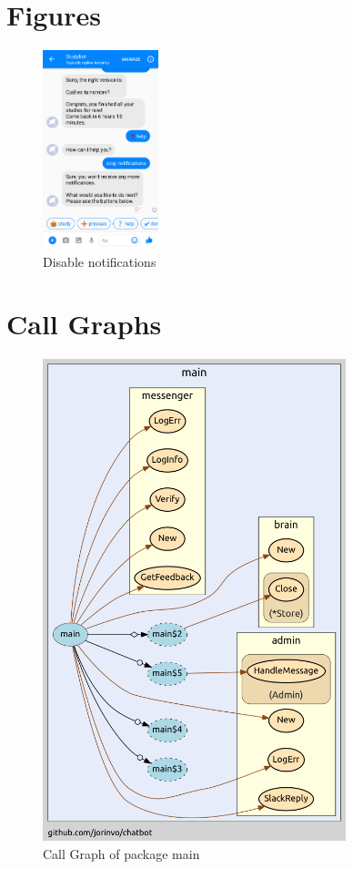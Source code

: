 \appendix

\chapter{Figures}


\begin{figure}[H]
  \centering
  \includegraphics[width=0.3\textwidth]{images/interface/10-disable-notify.png}
	\caption{Disable notifications}
	\label{fig:10-disable-notify}
\end{figure}


\chapter{Call Graphs}

\begin{figure}[H]
  \centering
  \includegraphics[height=14cm]{images/call-graph-main.png}
	\caption{Call Graph of package main}
  \label{a:call-graph}
\end{figure}

